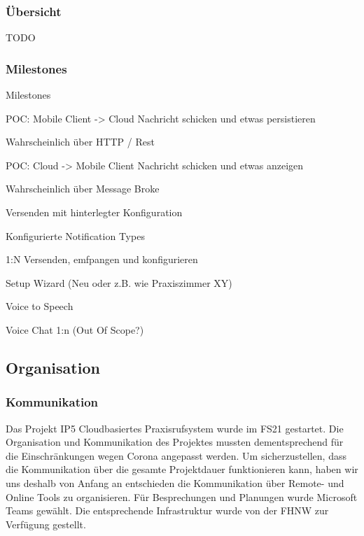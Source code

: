 \subsubsection*{Übersicht}

TODO

\subsubsection*{Milestones}

Milestones 

 

    POC: Mobile Client -> Cloud Nachricht schicken und etwas persistieren 

        Wahrscheinlich über HTTP / Rest 
         

    POC: Cloud -> Mobile Client Nachricht schicken und etwas anzeigen 

        Wahrscheinlich über Message Broke 
         

    Versenden mit hinterlegter Konfiguration 
     

    Konfigurierte Notification Types 
     

    1:N Versenden, emfpangen und konfigurieren 
     

    Setup Wizard (Neu oder z.B. wie Praxiszimmer XY) 
     

    Voice to Speech 
     

    Voice Chat 1:n (Out Of Scope?) 




\clearpage

\subsection{Organisation}

    \subsubsection*{Kommunikation}

        Das Projekt IP5 Cloudbasiertes Praxisrufsystem wurde im FS21 gestartet. Die Organisation und Kommunikation des Projektes mussten dementsprechend für die Einschränkungen wegen Corona angepasst werden. 
        Um sicherzustellen, dass die Kommunikation über die gesamte Projektdauer funktionieren kann, haben wir uns deshalb von Anfang an entschieden die Kommunikation über Remote- und Online Tools zu organisieren. 
        Für Besprechungen und Planungen wurde Microsoft Teams gewählt. Die entsprechende Infrastruktur wurde von der FHNW zur Verfügung gestellt. 

